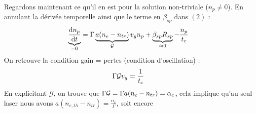 	Regardons maintenant ce qu'il en est pour la solution non-triviale ($n_p\neq 0$). En annulant
	la dérivée temporelle ainsi que le terme en $\beta_{sp}$ dans $(2)$ :
	\begin{equation}
	\underbrace{\frac{{{\rm{d}}{n_p}}}{{{\rm{d}}t}}}_{=0} = \Gamma \underbrace{a({n_e} - {n_{tr}})}_{\mathcal{G}}{v_g}{n_p} + \underbrace{{\beta _{sp}}{R_{sp}}}_{\approx0} - \frac{{{n_p}}}{{{t_c}}}
	\end{equation}
	On retrouve la condition gain = pertes	(condition d'oscillation) :
	\begin{equation}
	\Gamma {{\cal G}}{v_g} = \frac{1}{{{t_c}}}
	\end{equation}
	En explicitant $\mathcal{G}$, on trouve que $\Gamma {{\cal G}} = \Gamma a({n_e} - {n_{tr}}) =
	{\alpha _c}$, cela implique qu'au seul laser nous avons 	 $a({n_{e,th}} - {n_{tr}}) =
	\frac{{{\alpha_c}}}{\Gamma }$, soit encore\\
	
	\ \\
	
